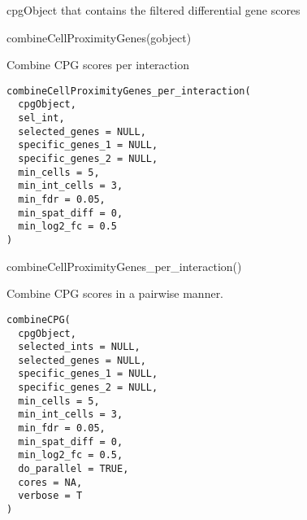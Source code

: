 \documentclass[a4paper]{book}
\begin{document}
%
\begin{Value}
cpgObject that contains the filtered differential gene scores
\end{Value}
%
\begin{Examples}
\begin{ExampleCode}
    combineCellProximityGenes(gobject)
\end{ExampleCode}
\end{Examples}
%
\begin{Description}\relax
Combine CPG scores per interaction
\end{Description}
%
\begin{Usage}
\begin{verbatim}
combineCellProximityGenes_per_interaction(
  cpgObject,
  sel_int,
  selected_genes = NULL,
  specific_genes_1 = NULL,
  specific_genes_2 = NULL,
  min_cells = 5,
  min_int_cells = 3,
  min_fdr = 0.05,
  min_spat_diff = 0,
  min_log2_fc = 0.5
)
\end{verbatim}
\end{Usage}
%
\begin{Examples}
\begin{ExampleCode}
    combineCellProximityGenes_per_interaction()
\end{ExampleCode}
\end{Examples}
%
\begin{Description}\relax
Combine CPG scores in a pairwise manner.
\end{Description}
%
\begin{Usage}
\begin{verbatim}
combineCPG(
  cpgObject,
  selected_ints = NULL,
  selected_genes = NULL,
  specific_genes_1 = NULL,
  specific_genes_2 = NULL,
  min_cells = 5,
  min_int_cells = 3,
  min_fdr = 0.05,
  min_spat_diff = 0,
  min_log2_fc = 0.5,
  do_parallel = TRUE,
  cores = NA,
  verbose = T
)
\end{verbatim}
\end{Usage}
%
\end{document}
